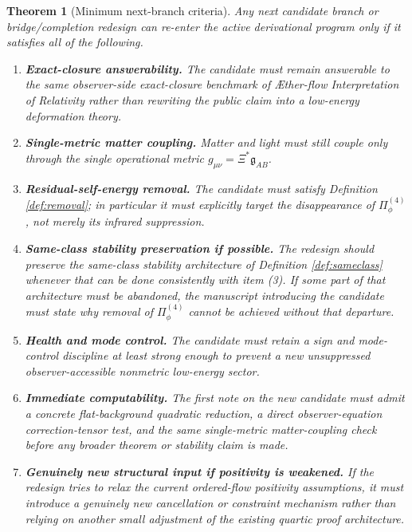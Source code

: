 \documentclass[11pt]{article}
\newcommand{\Aflow}{\AE{}ther-flow}
\newcommand{\TheoryName}{\Aflow{} Interpretation of Relativity}
\newcommand{\BridgeMetric}{\mathfrak{g}}
\newtheorem{theorem}{Theorem}
\begin{document}
\begin{theorem}[Minimum next-branch criteria]
\label{thm:criteria}
Any next candidate branch or bridge/completion redesign can re-enter the active derivational program only if it satisfies all of the following.
\begin{enumerate}
    \item \textbf{Exact-closure answerability.} The candidate must remain answerable to the same observer-side exact-closure benchmark of \TheoryName{} rather than rewriting the public claim into a low-energy deformation theory.
    \item \textbf{Single-metric matter coupling.} Matter and light must still couple only through the single operational metric \(g_{\mu\nu}=\Xi^\ast\BridgeMetric_{AB}\).
    \item \textbf{Residual-self-energy removal.} The candidate must satisfy Definition \ref{def:removal}; in particular it must explicitly target the disappearance of \(\Pi_\phi^{(4)}\), not merely its infrared suppression.
    \item \textbf{Same-class stability preservation if possible.} The redesign should preserve the same-class stability architecture of Definition \ref{def:sameclass} whenever that can be done consistently with item (3). If some part of that architecture must be abandoned, the manuscript introducing the candidate must state why removal of \(\Pi_\phi^{(4)}\) cannot be achieved without that departure.
    \item \textbf{Health and mode control.} The candidate must retain a sign and mode-control discipline at least strong enough to prevent a new unsuppressed observer-accessible nonmetric low-energy sector.
    \item \textbf{Immediate computability.} The first note on the new candidate must admit a concrete flat-background quadratic reduction, a direct observer-equation correction-tensor test, and the same single-metric matter-coupling check before any broader theorem or stability claim is made.
    \item \textbf{Genuinely new structural input if positivity is weakened.} If the redesign tries to relax the current ordered-flow positivity assumptions, it must introduce a genuinely new cancellation or constraint mechanism rather than relying on another small adjustment of the existing quartic proof architecture.
\end{enumerate}
\end{theorem}
\end{document}
